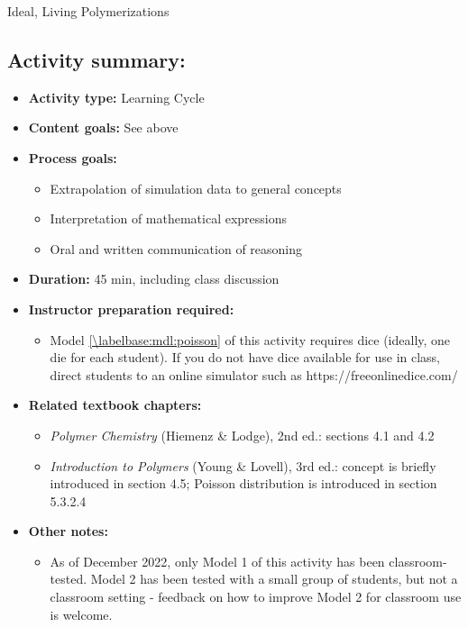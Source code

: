 \begin{activity}{Ideal, Living Polymerizations}
\begin{instructornotes}
	\subsection*{Activity summary:}
	\begin{itemize}
		\item \textbf{Activity type:} Learning Cycle
		\item \textbf{Content goals:} See above
		\item \textbf{Process goals:} %
			\begin{itemize}
				\item Extrapolation of simulation data to general concepts
				\item Interpretation of mathematical expressions
				\item Oral and written communication of reasoning
			\end{itemize}
		\item \textbf{Duration:} 45 min, including class discussion
		\item \textbf{Instructor preparation required:}
			\begin{itemize}
				\item Model \ref{\labelbase:mdl:poisson} of this activity requires dice (ideally, one die for each student).  If you do not have dice available for use in class, direct students to an online simulator such as https://freeonlinedice.com/
			\end{itemize}
		\item \textbf{Related textbook chapters:}
			\begin{itemize}
				\item \emph{Polymer Chemistry} (Hiemenz \& Lodge), 2nd ed.: sections 4.1 and 4.2
				\item \emph{Introduction to Polymers} (Young \& Lovell), 3rd ed.: concept is briefly introduced in section 4.5; Poisson distribution is introduced in section 5.3.2.4
			\end{itemize}
		\item \textbf{Other notes:}
			\begin{itemize}
				\item As of December 2022, only Model 1 of this activity has been classroom-tested.  Model 2 has been tested with a small group of students, but not a classroom setting - feedback on how to improve Model 2 for classroom use is welcome.

\end{itemize}
\end{itemize}
\end{instructornotes}
\end{activity}
